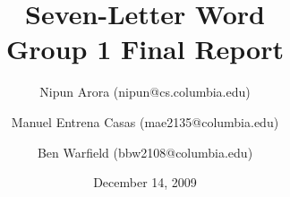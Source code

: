 \documentclass[11pt]{article}
\begin{document}
\title{Seven-Letter Word\\Group 1 Final Report}

\author{ 
	Nipun Arora (nipun@cs.columbia.edu)
 \and Manuel Entrena Casas (mae2135@columbia.edu) 
 \and Ben Warfield (bbw2108@columbia.edu)}
 
\date{December 14, 2009}
\maketitle
\end{document}
